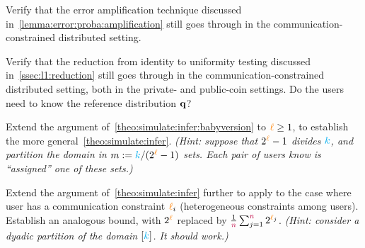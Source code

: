 \begin{question}\label{exo:error:amplification}
Verify that the error amplification technique discussed in~\cref{lemma:error:proba:amplification} still goes through in the communication-constrained distributed setting.
\end{question}
\begin{question}\label{exo:identity:reduction}
Verify that the reduction from identity to uniformity testing discussed in~\cref{ssec:l1:reduction} still goes through in the communication-constrained distributed setting, both in the private- and public-coin settings. Do the users need to know the reference distribution $\mathbf{q}$?
\end{question}
\begin{question}[$\star$]\label{exo:simulate:infer}
Extend the argument of~\cref{theo:simulate:infer:babyversion} to ${\textcolor{orange}{\ell}}\geq 1$, to establish the more general~\cref{theo:simulate:infer}. \emph{(Hint: suppose that $2^{\textcolor{orange}{\ell}} -1$ divides ${\textcolor{cyan}{k}}$, and partition the domain in $m:= {\textcolor{cyan}{k}}/(2^{\textcolor{orange}{\ell}} -1)$ sets. Each pair of users know is ``assigned'' one of these sets.)}
\end{question}
\begin{question}[$\star\star$]\label{exo:heterogeneous}
Extend the argument of~\cref{theo:simulate:infer} further to apply to the case where user has a communication constraint ${\textcolor{orange}{\ell}}_i$ (heterogeneous constraints among users). Establish an analogous bound, with $2^{\textcolor{orange}{\ell}}$ replaced by $\frac{1}{{\textcolor{purple}{n}}}\sum_{j=1}^{\textcolor{purple}{n}} 2^{{\textcolor{orange}{\ell}}_j}$. \emph{(Hint: consider a dyadic partition of the domain $[{\textcolor{cyan}{k}}]$. It \emph{should} work.)}
\end{question}
